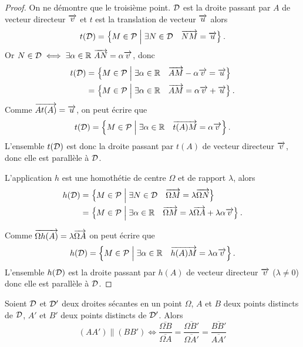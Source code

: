 \begin{proof}
  On ne démontre que le troisième point. \(\mathcal{D}\) est la droite passant par \(A\)
  de vecteur directeur \(\overrightarrow{v}\) et \(t\) est la translation de vecteur \(\overrightarrow{u}\)
  alors
  \begin{equation}
    t(\mathcal{D}) = \left\{M \in \mathcal{P}\mathrel{}\middle|\mathrel{}\exists N \in \mathcal{D} \quad \overrightarrow{NM} = \overrightarrow{u}\right\}.
  \end{equation}
  Or \(N \in \mathcal{D} \iff \exists \alpha \in \mathbb{R} \ \overrightarrow{AN} = \alpha \overrightarrow{v}\), donc
  \begin{align}
    t(\mathcal{D})& = \left\{M \in \mathcal{P}\mathrel{}\middle|\mathrel{}\exists \alpha \in \mathbb{R} \quad \overrightarrow{AM} - \alpha
    \overrightarrow{v} = \overrightarrow{u}\right\} \\
          & = \left\{M \in \mathcal{P}\mathrel{}\middle|\mathrel{}\exists \alpha \in \mathbb{R} \quad \overrightarrow{AM} =
          \alpha \overrightarrow{v} + \overrightarrow{u}\right\}.
  \end{align}
  Comme \(\overrightarrow{At(A)} = \overrightarrow{u}\), on peut écrire que
  \begin{equation}
    t(\mathcal{D}) = \left\{M \in \mathcal{P}\mathrel{}\middle|\mathrel{}\exists \alpha \in \mathbb{R} \quad \overrightarrow{t(A)M} =
    \alpha \overrightarrow{v}\right\}.
  \end{equation}
  L'ensemble \(t(\mathcal{D})\) est donc la droite passant par \(t(A)\) de vecteur
  directeur \(\overrightarrow{v}\), donc elle est parallèle à \(\mathcal{D}\).

  L'application \(h\) est une homothétie de centre \(\Omega\) et de
  rapport \(\lambda\), alors
  \begin{align}
    h(\mathcal{D})& = \left\{M \in \mathcal{P}\mathrel{}\middle|\mathrel{}\exists N \in \mathcal{D} \quad \overrightarrow{\Omega M} =
    \lambda \overrightarrow{\Omega N}\right\}\\
          & = \left\{M \in \mathcal{P}\mathrel{}\middle|\mathrel{}\exists \alpha \in \mathbb{R} \quad \overrightarrow{\Omega M}
          = \lambda \overrightarrow{\Omega A} + \lambda\alpha \overrightarrow{v}\right\}.
  \end{align}

  Comme \(\overrightarrow{\Omega h(A)} = \lambda \overrightarrow{\Omega A}\) on peut écrire
  que
  \begin{equation}
    h(\mathcal{D}) = \left\{M \in \mathcal{P}\mathrel{}\middle|\mathrel{}\exists \alpha \in \mathbb{R} \quad \overrightarrow{h(A) M}
    = \lambda\alpha \overrightarrow{v}\right\}.
  \end{equation}
  L'ensemble \(h(\mathcal{D})\) est la droite passant par \(h(A)\) de vecteur
  directeur \(\overrightarrow{v}\) (\(\lambda \neq 0\)) donc elle est parallèle à
  \(\mathcal{D}\).
\end{proof}

\begin{theo}
  Soient \(\mathcal{D}\) et \(\mathcal{D}'\) deux droites sécantes en un point
  \(\Omega\), \(A\) et \(B\) deux points distincts de \(\mathcal{D}\), \(A'\) et
  \(B'\) deux points distincts de \(\mathcal{D}'\). Alors
  \begin{equation}
    (AA') \parallel (BB') \iff \frac{\overline{\Omega
    B}}{\overline{\Omega A}} = \frac{\overline{\Omega
    B'}}{\overline{\Omega A'}} = \frac{\overline{BB'}}{\overline{AA'}}
  \end{equation}
\end{theo}

